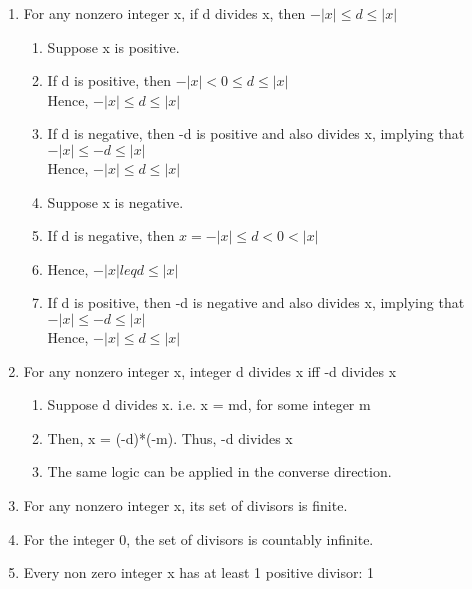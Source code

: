 \documentclass{article}
\begin{document}
\begin{enumerate}
\item For any nonzero integer x, if d divides x, then $ -|x| \leq d \leq |x| $
\begin{enumerate}
\item Suppose x is positive.
\item If d is positive, then $ -|x| < 0 \leq d \leq |x| $
\\ Hence, $ -|x| \leq d \leq |x| $
\item If d is negative, then -d is positive and also divides x, implying that $ -|x| \leq -d \leq |x| $
\\ Hence, $ -|x| \leq d \leq |x| $
\item Suppose x is negative.
\item If d is negative, then $ x = -|x| \leq d < 0 < |x| $
\item Hence, $ -|x| leq d \leq |x| $
\item If d is positive, then -d is negative and also divides x, implying that $
-|x| \leq -d \leq |x| $
\\ Hence, $ -|x| \leq d \leq |x| $
\end{enumerate}

\item For any nonzero integer x, integer d divides x iff -d divides x
\begin{enumerate}
\item Suppose d divides x. i.e. x = md, for some integer m
\item Then, x = (-d)*(-m). Thus, -d divides x
\item The same logic can be applied in the converse direction.
\end{enumerate}

\item For any nonzero integer x, its set of divisors is finite.
\item For the integer 0, the set of divisors is countably infinite.

\item Every non zero integer x has at least 1 positive divisor: 1
\end{enumerate}
\end{document}
